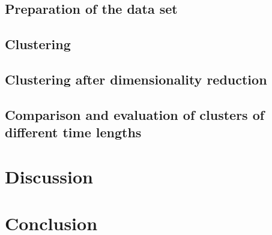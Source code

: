   \subsection{Preparation of the data set}
  \label{section:ExperimentPreparationDataSet}
  

  \subsection{Clustering}
  \label{section:ExperimentClustering}
  

  \subsection{Clustering after dimensionality reduction}
  \label{section:ExperimentClusteringAfterDimensionalityReduction}
  

  \subsection{Comparison and evaluation of clusters of different time lengths}
  \label{section:ExperimentComparisonTimeLengths}
  



\section{Discussion}
\label{section:Discussion}




\section{Conclusion}
\label{section:Conclusion}


